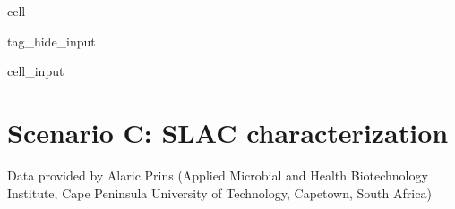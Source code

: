 \documentclass[letterpaper,12pt,english]{jupyterBook}
\begin{document}
\begin{sphinxuseclass}{cell}
\begin{sphinxuseclass}{tag_hide_input}
\begin{sphinxVerbatimInput}
\begin{sphinxuseclass}{cell_input}
\begin{sphinxVerbatim}[commandchars=\\\{\}]
      
        \PYG{p}{[}\PYG{p}{]}

      
        \PYG{p}{[}  \PYG{p}{]}

      

      
     
\end{sphinxVerbatim}

\end{sphinxuseclass}\end{sphinxVerbatimInput}

\end{sphinxuseclass}
\end{sphinxuseclass}
\sphinxstepscope

\newpage
\section{Scenario C: SLAC characterization}
\label{\detokenize{scenarios/SLAC_kinetic_characterization:scenario-c-br-slac-characterization}}\label{\detokenize{scenarios/SLAC_kinetic_characterization::doc}}
\sphinxAtStartPar
Data provided by Alaric Prins (Applied Microbial and Health Biotechnology Institute, Cape Peninsula University of Technology, Capetown, South Africa)
\end{document}
